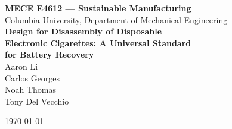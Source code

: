 \documentclass[11pt]{article}
\begin{document}
\begin{titlepage}
\centering
\vspace*{2cm}

{\Large\textbf{MECE E4612 --- Sustainable Manufacturing}}\\[0.5cm]
{\large Columbia University, Department of Mechanical Engineering}\\[2cm]

{\LARGE\textbf{Design for Disassembly of Disposable\\[0.3cm]
Electronic Cigarettes: A Universal Standard\\[0.3cm]
for Battery Recovery}}\\[3cm]

{\large
{Aaron Li}\\[4pt]
{Carlos Georges}\\[4pt]
{Noah Thomas}\\[4pt]
{Tony Del Vecchio}\\[2cm]
}

\authorlegend

\vfill
{\large \today}
\end{titlepage}

\tableofcontents
\newpage









\newpage


\end{document}
